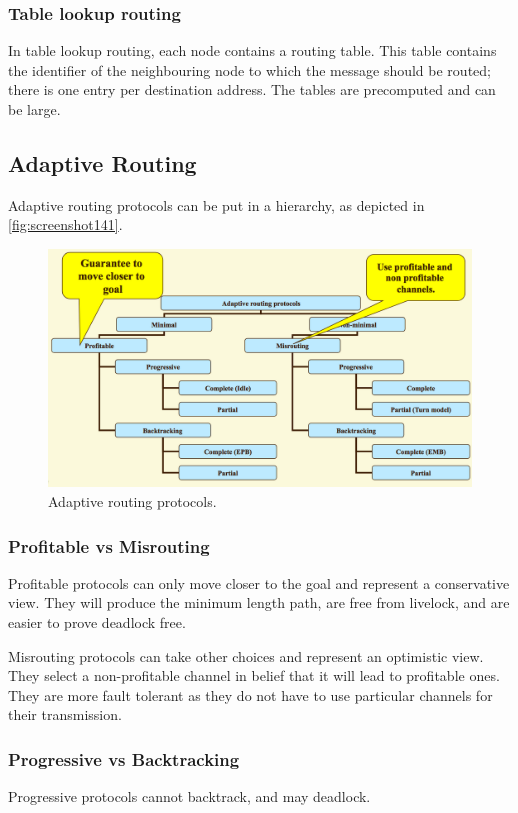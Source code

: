 \subsubsection{Table lookup routing}
In table lookup routing, each node contains a routing table. This table contains the identifier of the neighbouring node to which the message should be routed; there is one entry per destination address. The tables are precomputed and can be large.

\subsection{Adaptive Routing}
Adaptive routing protocols can be put in a hierarchy, as depicted in \autoref{fig:screenshot141}.

\begin{figure}
\centering
\includegraphics[width=0.7\linewidth]{screenshot141}
\caption{Adaptive routing protocols.}
\label{fig:screenshot141}
\end{figure}

\subsubsection{Profitable vs Misrouting}
Profitable protocols can only move closer to the goal and represent a conservative view. They will produce the minimum length path, are free from livelock, and are easier to prove deadlock free.

Misrouting protocols can take other choices and represent an optimistic view. They select a non-profitable channel in belief that it will lead to profitable ones. They are more fault tolerant as they do not have to use particular channels for their transmission.

\subsubsection{Progressive vs Backtracking}
Progressive protocols cannot backtrack, and may deadlock.

